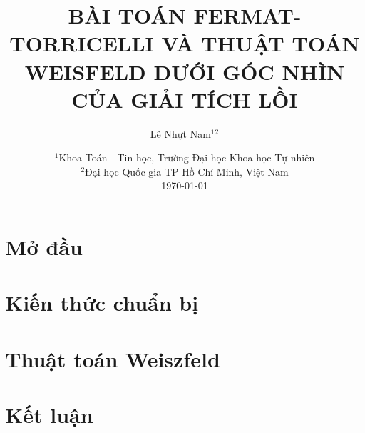 \documentclass[a4paper]{report}
\title{BÀI TOÁN FERMAT-TORRICELLI VÀ THUẬT TOÁN WEISFELD DƯỚI GÓC NHÌN CỦA GIẢI TÍCH LỒI}
\author{Lê Nhựt Nam$^1$$^2$}
\date{
    $^1$Khoa Toán - Tin học, Trường Đại học Khoa học Tự nhiên\\%
    $^2$Đại học Quốc gia TP Hồ Chí Minh, Việt Nam\\%
    \vfill
    \today
}
\begin{document}
    \maketitle
    \tableofcontents
    
    \chapter{Mở đầu}


    \chapter{Kiến thức chuẩn bị}


    \chapter{Thuật toán Weiszfeld}


    \chapter{Kết luận}
    

    \nocite{*}
\end{document}
